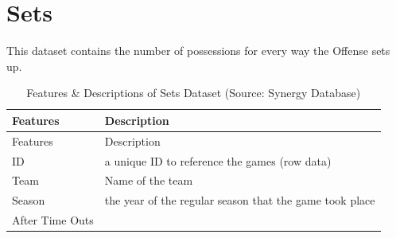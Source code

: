 \documentclass[]{book}
\begin{document}
\hypertarget{sets}{%
\section{Sets}\label{sets}}

This dataset contains the number of possessions for every way the Offense sets up.

\begin{longtable}[]{@{}ll@{}}
\caption{\label{tab:sets} Features \& Descriptions of Sets Dataset (Source: Synergy Database)}\tabularnewline
\toprule
\begin{minipage}[b]{0.32\columnwidth}\raggedright
Features\strut
\end{minipage} & \begin{minipage}[b]{0.62\columnwidth}\raggedright
Description\strut
\end{minipage}\tabularnewline
\midrule
\endfirsthead
\toprule
\begin{minipage}[b]{0.32\columnwidth}\raggedright
Features\strut
\end{minipage} & \begin{minipage}[b]{0.62\columnwidth}\raggedright
Description\strut
\end{minipage}\tabularnewline
\midrule
\endhead
\begin{minipage}[t]{0.32\columnwidth}\raggedright
ID\strut
\end{minipage} & \begin{minipage}[t]{0.62\columnwidth}\raggedright
a unique ID to reference the games (row data)\strut
\end{minipage}\tabularnewline
\begin{minipage}[t]{0.32\columnwidth}\raggedright
Team\strut
\end{minipage} & \begin{minipage}[t]{0.62\columnwidth}\raggedright
Name of the team\strut
\end{minipage}\tabularnewline
\begin{minipage}[t]{0.32\columnwidth}\raggedright
Season\strut
\end{minipage} & \begin{minipage}[t]{0.62\columnwidth}\raggedright
the year of the regular season that the game took place\strut
\end{minipage}\tabularnewline
\begin{minipage}[t]{0.32\columnwidth}\raggedright
After Time Outs\strut
\end{minipage} & \begin{minipage}[t]{0.62\columnwidth}\raggedright

\end{minipage}
\end{longtable}
\end{document}
